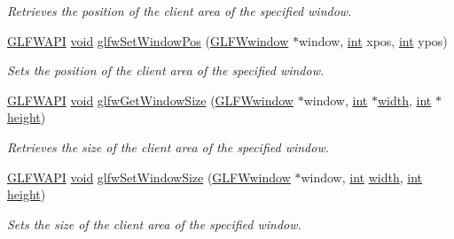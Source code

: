 \begin{DoxyCompactItemize}
\begin{DoxyCompactList}\small\item\em Retrieves the position of the client area of the specified window. \end{DoxyCompactList}\item 
\hyperlink{glfw3_8h_a56da5036b2cc259351ae22fd6439bb47}{G\+L\+F\+W\+A\+P\+I} \hyperlink{wglew_8h_aeea6e3dfae3acf232096f57d2d57f084}{void} \hyperlink{group__window_ga0dc8d880a0d87be16d3ea8114561f6f0}{glfw\+Set\+Window\+Pos} (\hyperlink{group__window_ga3c96d80d363e67d13a41b5d1821f3242}{G\+L\+F\+Wwindow} $\ast$window, \hyperlink{wglew_8h_a500a82aecba06f4550f6849b8099ca21}{int} xpos, \hyperlink{wglew_8h_a500a82aecba06f4550f6849b8099ca21}{int} ypos)
\begin{DoxyCompactList}\small\item\em Sets the position of the client area of the specified window. \end{DoxyCompactList}\item 
\hyperlink{glfw3_8h_a56da5036b2cc259351ae22fd6439bb47}{G\+L\+F\+W\+A\+P\+I} \hyperlink{wglew_8h_aeea6e3dfae3acf232096f57d2d57f084}{void} \hyperlink{group__window_ga7feb769ebb3f3d21579b5a3fb07be76e}{glfw\+Get\+Window\+Size} (\hyperlink{group__window_ga3c96d80d363e67d13a41b5d1821f3242}{G\+L\+F\+Wwindow} $\ast$window, \hyperlink{wglew_8h_a500a82aecba06f4550f6849b8099ca21}{int} $\ast$\hyperlink{glew_8h_aa105b18f96e6bc2485cb7f576a7fb9ba}{width}, \hyperlink{wglew_8h_a500a82aecba06f4550f6849b8099ca21}{int} $\ast$\hyperlink{glew_8h_aa214bd63e12f7ddf524c83894fcc69a7}{height})
\begin{DoxyCompactList}\small\item\em Retrieves the size of the client area of the specified window. \end{DoxyCompactList}\item 
\hyperlink{glfw3_8h_a56da5036b2cc259351ae22fd6439bb47}{G\+L\+F\+W\+A\+P\+I} \hyperlink{wglew_8h_aeea6e3dfae3acf232096f57d2d57f084}{void} \hyperlink{group__window_gae54d1f4915ded15e267ddd3f41496cd2}{glfw\+Set\+Window\+Size} (\hyperlink{group__window_ga3c96d80d363e67d13a41b5d1821f3242}{G\+L\+F\+Wwindow} $\ast$window, \hyperlink{wglew_8h_a500a82aecba06f4550f6849b8099ca21}{int} \hyperlink{glew_8h_aa105b18f96e6bc2485cb7f576a7fb9ba}{width}, \hyperlink{wglew_8h_a500a82aecba06f4550f6849b8099ca21}{int} \hyperlink{glew_8h_aa214bd63e12f7ddf524c83894fcc69a7}{height})
\begin{DoxyCompactList}\small\item\em Sets the size of the client area of the specified window. \end{DoxyCompactList}\item 

\end{DoxyCompactItemize}
